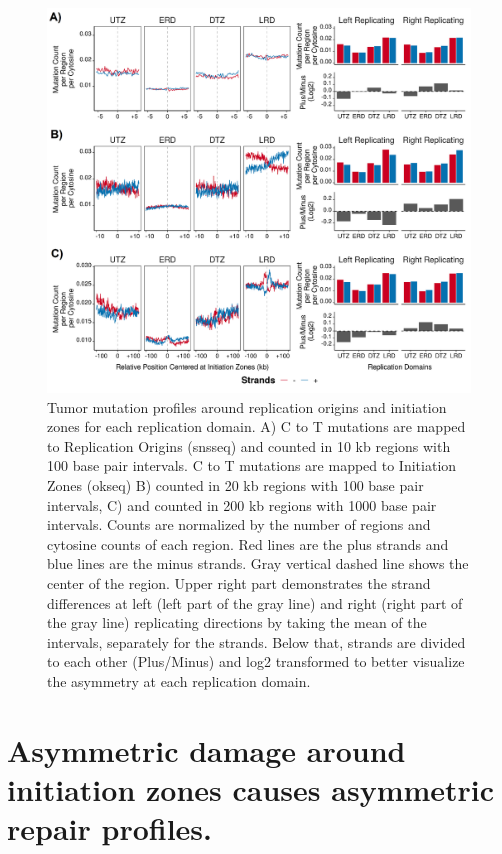\begin{figure}[H]
    \begin{center}
    \includegraphics[width=\textwidth]{Chapters/4_results/figures/fig4}
    \caption[Tumor mutation profiles around replication origins and initiation zones for each replication domain.]{Tumor mutation profiles around replication origins and initiation zones for each replication domain. A) C to T mutations are mapped to Replication Origins (\gls{snsseq}) and counted in 10 \gls{kb} regions with 100 base pair intervals. C to T mutations are mapped to Initiation Zones (\gls{okseq}) B) counted in 20 \gls{kb} regions with 100 base pair intervals, C) and counted in 200 \gls{kb} regions with 1000 base pair intervals. Counts are normalized by the number of regions and cytosine counts of each region. Red lines are the plus strands and blue lines are the minus strands. Gray vertical dashed line shows the center of the region. Upper right part demonstrates the strand differences at left (left part of the gray line) and right (right part of the gray line) replicating directions by taking the mean of the intervals, separately for the strands. Below that, strands are divided to each other (Plus/Minus) and log2 transformed to better visualize the asymmetry at each replication domain.}
    \label{fig:mutation}
    \end{center}
    \end{figure}

\section{Asymmetric damage around initiation zones causes asymmetric repair profiles.}

